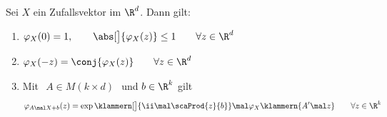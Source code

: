 \begin{satz}\label{satz4.6}
	Sei $X$ ein Zufallsvektor im $\R^d$.
	Dann gilt:
	\begin{enumerate}[label=(\arabic*)]
		\item $\begin{aligned}
			\varphi_X(0)=1,\qquad\abs[\big]{\varphi_X(z)}\leq 1\qquad\forall z\in\R^d
		\end{aligned}$
		\label{item:satz4.6_1}
		\item $\begin{aligned}
			\varphi_X(-z)=\conj{\varphi_X(z)}\qquad\forall z\in\R^d
		\end{aligned}$
		\label{item:satz4.6_2}
		\item Mit $\begin{aligned}
			A\in M(k\times d)
		\end{aligned}$ und $b\in\R^k$ gilt
		\begin{align*}
			\varphi_{A\mal X+b}(z)=\exp\klammern[\big]{\ii\mal\scaProd{z}{b}}\mal\varphi_X\klammern{A'\mal z}\qquad\forall z\in\R^k
		\end{align*}
		\label{item:satz4.6_3}
	\end{enumerate}
\end{satz}


